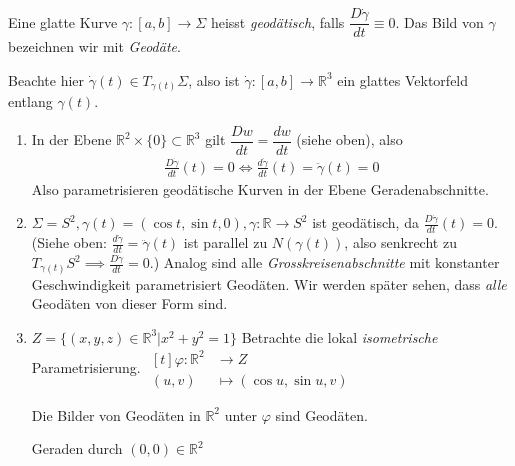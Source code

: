 \documentclass[../main.tex]{subfiles}
\begin{document}
\begin{definition}
Eine glatte Kurve $\gamma : [a,b] \to \Sigma$ heisst \emph{geodätisch}, falls
$\dfrac{D\dot{\gamma}}{dt}\equiv 0 $. Das Bild von $\gamma$ bezeichnen wir mit \emph{Geodäte}.
\end{definition}
Beachte hier $\dot{\gamma}(t) \in T_{\gamma(t)}\Sigma$, also ist $\dot{\gamma}:[a,b] \to \mathbb{R}^3$ ein glattes Vektorfeld entlang $\gamma(t)$.


\begin{examples}
\begin{enumerate}
    \item In der Ebene $\mathbb{R}^2 \times \{0\} \subset \mathbb{R}^3$ gilt $\dfrac{Dw}{dt} = \dfrac{dw}{dt}$ (siehe oben), also 
    \begin{align*}
        \frac{D\dot{\gamma}}{dt}(t)=0 \iff \frac{d\dot{\gamma}}{dt}(t) = \ddot{\gamma}(t) = 0
    \end{align*} Also parametrisieren geodätische Kurven in der Ebene Geradenabschnitte.
    
    \item $\Sigma = S^2, \gamma(t) = (\cos t, \sin t, 0), \gamma : \mathbb{R} \to S^2$ ist geodätisch, da $\frac{D\dot{\gamma}}{dt}(t)=0$. \\
    (Siehe oben: $\frac{d\dot{\gamma}}{dt} = \ddot{\gamma}(t)$ ist parallel zu $N(\gamma(t))$, also senkrecht zu $T_{\gamma(t)}S^2 \implies \frac{D\dot{\gamma}}{dt}=0$.) Analog sind alle \emph{Grosskreisenabschnitte} mit konstanter Geschwindigkeit parametrisiert Geodäten. Wir werden später sehen, dass \emph{alle} Geodäten von dieser Form sind.
    \item $Z = \{(x,y,z) \in \mathbb{R}^3 | x^2 + y^2 = 1\}$
    Betrachte die lokal \emph{isometrische} Parametrisierung.
    $\begin{aligned}[t]
        \varphi : \mathbb{R}^2 & \to Z \\
        (u,v) & \mapsto (\cos u, \sin u, v)
    \end{aligned}$
    \begin{claim}
        Die Bilder von Geodäten in $\mathbb{R}^2$ unter $\varphi$ sind Geodäten.
    \end{claim}
    
    \begin{specialcase}
        Geraden durch $(0,0) \in \mathbb{R}^2$
    \end{specialcase}

\end{enumerate}
\end{examples}
\newpage
\end{document}
